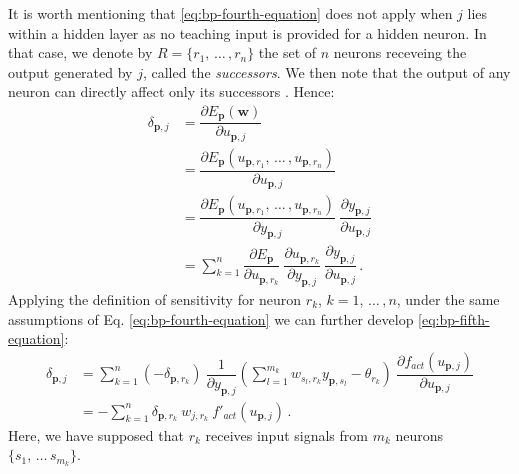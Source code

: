 \documentclass[12pt, a4paper, twoside, openright, notitlepage]{report}
\numberwithin{equation}{chapter}
\theoremstyle{theorem}
\theoremstyle{definition}
\theoremstyle{remark}
\theoremstyle{proposition}
\numberwithin{figure}{chapter}
\begin{document}
		It is worth mentioning that \eqref{eq:bp-fourth-equation} does not apply when $j$ lies within a hidden layer as no teaching input is provided for a hidden neuron. In that case, we denote by $R = \big\lbrace r_1, \, \ldots \, , r_n \big\rbrace$ the set of $n$ neurons receveing the output generated by $j$, called the \emph{successors}. We then note that the output of any neuron can directly affect only its successors \cite{Kri07}. Hence: 
		\begin{equation}
			\label{eq:bp-fifth-equation}
			\begin{aligned}
				\delta_{\mathbf{p},j} & = \dfrac{\partial E_{\mathbf{p}}(\mathbf{w})}{\partial u_{\mathbf{p},j}} \\
				& = \dfrac{\partial E_{\mathbf{p}}(u_{\mathbf{p},r_1}, \, \ldots \, , u_{\mathbf{p},r_n})}{\partial u_{\mathbf{p},j}} \\
				& = \dfrac{\partial E_{\mathbf{p}}(u_{\mathbf{p},r_1}, \, \ldots \, , u_{\mathbf{p},r_n})}{\partial y_{\mathbf{p},j}} ~ \dfrac{\partial y_{\mathbf{p},j}}{\partial u_{\mathbf{p},j}} \\
				& = \sum_{k = 1}^{n} \dfrac{\partial E_{\mathbf{p}}}{\partial u_{\mathbf{p},r_k}} ~ \dfrac{\partial u_{\mathbf{p},r_k}}{\partial y_{\mathbf{p},j}} ~ \dfrac{\partial y_{\mathbf{p},j}}{\partial u_{\mathbf{p},j}} \, .
			\end{aligned}
		\end{equation}
		Applying the definition of sensitivity for neuron $r_k$, $k = 1, \, \ldots \, , n$, under the same assumptions of Eq. \eqref{eq:bp-fourth-equation} we can further develop \eqref{eq:bp-fifth-equation}:
		\begin{equation}
			\label{eq:bp-sixth-equation}
			\begin{aligned}
			\delta_{\mathbf{p},j} & = \sum_{k = 1}^n \left( - \delta_{\mathbf{p},r_k} \right) ~ \dfrac{1}{\partial y_{\mathbf{p},j}} \left( \sum_{l = 1}^{m_k} w_{s_l,r_k} y_{\mathbf{p},s_l} - \theta_{r_k} \right) ~ \dfrac{\partial f_{act}(u_{\mathbf{p},j})}{\partial u_{\mathbf{p},j}} \\
			& = - \sum_{k = 1}^n \delta_{\mathbf{p},r_k} ~ w_{j,r_k} ~ f'_{act}(u_{\mathbf{p},j}) \, .
			\end{aligned}
		\end{equation}
		Here, we have supposed that $r_k$ receives input signals from $m_k$ neurons $\big\lbrace s_1, \, \ldots \, s_{m_k} \big\rbrace$.
		
\end{document}
